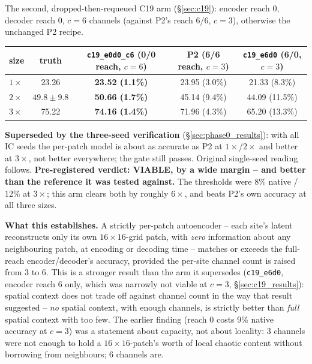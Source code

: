 \documentclass[11pt]{article}
\begin{document}
The second, dropped-then-requeued C19 arm (\S\ref{sec:c19}): encoder
reach 0, decoder reach 0, $c{=}6$ channels (against P2's reach 6/6,
$c{=}3$), otherwise the unchanged P2 recipe.

\begin{center}
\small
\begin{tabular}{lcccc}
\toprule
size & truth & \texttt{c19\_e0d0\_c6} (0/0 reach, $c{=}6$) & P2 (6/6 reach, $c{=}3$) & \texttt{c19\_e6d0} (6/0, $c{=}3$) \\
\midrule
$1\times$ & 23.26 & \textbf{23.52 (1.1\%)} & 23.95 (3.0\%) & 21.33 (8.3\%) \\
$2\times$ & $49.8\pm9.8$ & \textbf{50.66 (1.7\%)} & 45.14 (9.4\%) & 44.09 (11.5\%) \\
$3\times$ & 75.22 & \textbf{74.16 (1.4\%)} & 71.96 (4.3\%) & 65.20 (13.3\%) \\
\bottomrule
\end{tabular}
\end{center}

\textbf{Superseded by the three-seed verification}
(\S\ref{sec:phase0_results}): with all IC seeds the per-patch model is
about as accurate as P2 at $1\times$/$2\times$ and better at $3\times$, not
better everywhere; the gate still passes. Original single-seed reading
follows. \textbf{Pre-registered verdict: VIABLE, by a wide margin -- and better
than the reference it was tested against.} The thresholds were 8\%
native / 12\% at $3\times$; this arm clears both by roughly $6\times$,
and beats P2's own accuracy at all three sizes.

\textbf{What this establishes.} A strictly per-patch autoencoder --
each site's latent reconstructs only its own $16\times16$-grid patch,
with \emph{zero} information about any neighbouring patch, at encoding
or decoding time -- matches or exceeds the full-reach encoder/decoder's
accuracy, provided the per-site channel count is raised from 3 to 6.
This is a stronger result than the arm it supersedes
(\texttt{c19\_e6d0}, encoder reach 6 only, which was narrowly not
viable at $c{=}3$, \S\ref{sec:c19_results}): spatial context does not
trade off against channel count in the way that result suggested --
\emph{no} spatial context, with enough channels, is strictly better than
\emph{full} spatial context with too few. The earlier finding (reach 0
costs 9\% native accuracy at $c{=}3$) was a statement about capacity,
not about locality: 3 channels were not enough to hold a
$16\times16$-patch's worth of local chaotic content without borrowing
from neighbours; 6 channels are.
\end{document}
